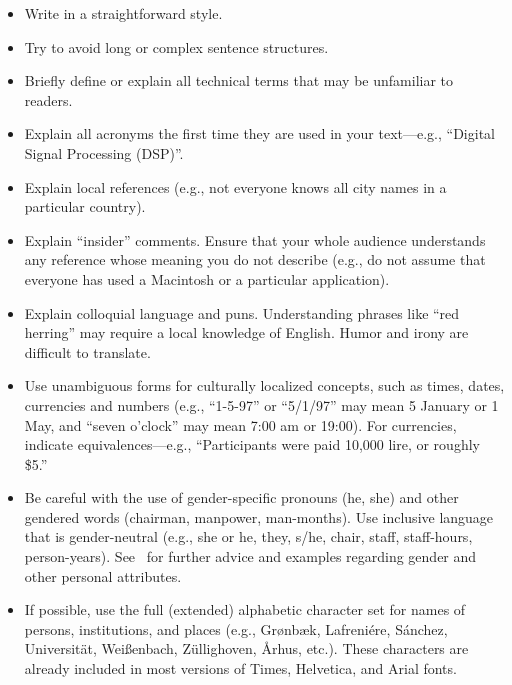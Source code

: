 \documentclass{sigchi}
\begin{document}
\begin{itemize}
\item Write in a straightforward style.
\item Try to avoid long or complex sentence structures.
\item Briefly define or explain all technical terms that may be
  unfamiliar to readers.
\item Explain all acronyms the first time they are used in your text---e.g.,
``Digital Signal Processing (DSP)''.
\item Explain local references (e.g., not everyone knows all city
  names in a particular country).
\item Explain ``insider'' comments. Ensure that your whole audience
  understands any reference whose meaning you do not describe (e.g.,
  do not assume that everyone has used a Macintosh or a particular
  application).
\item Explain colloquial language and puns. Understanding phrases like
  ``red herring'' may require a local knowledge of English.  Humor and
  irony are difficult to translate.
\item Use unambiguous forms for culturally localized concepts, such as
  times, dates, currencies and numbers (e.g., ``1-5-97'' or ``5/1/97''
  may mean 5 January or 1 May, and ``seven o'clock'' may mean 7:00 am or
  19:00).  For currencies, indicate equivalences---e.g., ``Participants
  were paid 10,000 lire, or roughly \$5.''
\item Be careful with the use of gender-specific pronouns (he, she)
  and other gendered words (chairman, manpower, man-months). Use
  inclusive language that is gender-neutral (e.g., she or he, they,
  s/he, chair, staff, staff-hours,
  person-years). See~\cite{Schwartz:1995:GBF} for further advice and
  examples regarding gender and other personal attributes.
\item If possible, use the full (extended) alphabetic character set
  for names of persons, institutions, and places (e.g.,
  Gr{\o}nb{\ae}k, Lafreni\'ere, S\'anchez, Universit{\"a}t,
  Wei{\ss}enbach, Z{\"u}llighoven, \r{A}rhus, etc.).  These characters
  are already included in most versions of Times, Helvetica, and Arial
  fonts.
\end{itemize}
\end{document}
